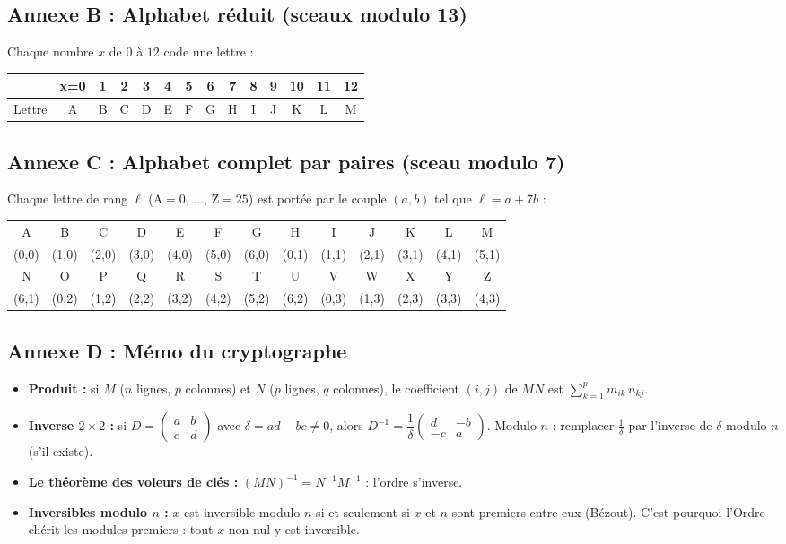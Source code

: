 \documentclass[11pt,a4paper]{article}
\begin{document}
\subsection*{Annexe B : Alphabet réduit (sceaux modulo 13)}
Chaque nombre $x$ de $0$ à $12$ code une lettre :
\begin{center}
	\begin{tabular}{l|*{13}{c}}
		& x=0 & 1 & 2 & 3 & 4 & 5 & 6 & 7 & 8 & 9 & 10 & 11 & 12\\
		\hline
		Lettre & A & B & C & D & E & F & G & H & I & J & K & L & M\\
	\end{tabular}
\end{center}

\subsection*{Annexe C : Alphabet complet par paires (sceau modulo 7)}
Chaque lettre de rang $\ell$ ($\text{A}=0$, $\dots$, $\text{Z}=25$) est portée
par le couple $(a,b)$ tel que $\ell = a + 7b$ :
\begin{center}
	\begin{tabular}{*{13}{c}}
		\toprule
		A & B & C & D & E & F & G & H & I & J & K & L & M\\
		(0,0) & (1,0) & (2,0) & (3,0) & (4,0) & (5,0) & (6,0) & (0,1) & (1,1) & (2,1) & (3,1) & (4,1) & (5,1)\\
		\midrule
		N & O & P & Q & R & S & T & U & V & W & X & Y & Z\\
		(6,1) & (0,2) & (1,2) & (2,2) & (3,2) & (4,2) & (5,2) & (6,2) & (0,3) & (1,3) & (2,3) & (3,3) & (4,3)\\
		\bottomrule
	\end{tabular}
\end{center}

\subsection*{Annexe D : Mémo du cryptographe}
\begin{itemize}
	\item \textbf{Produit :} si $M$ ($n$ lignes, $p$ colonnes) et $N$
	($p$ lignes, $q$ colonnes), le coefficient $(i,j)$ de $MN$ est
	$\sum_{k=1}^{p} m_{ik}\, n_{kj}$.
	\item \textbf{Inverse $2\times 2$ :} si $D = \begin{pmatrix}a&b\\c&d\end{pmatrix}$
	avec $\delta = ad-bc \neq 0$, alors
	$D^{-1} = \dfrac{1}{\delta}\begin{pmatrix}d&-b\\-c&a\end{pmatrix}$.
	Modulo $n$ : remplacer $\frac{1}{\delta}$ par l'inverse de $\delta$
	modulo $n$ (s'il existe).
	\item \textbf{Le théorème des voleurs de clés :}
	$(MN)^{-1} = N^{-1}M^{-1}$ : l'ordre s'inverse.
	\item \textbf{Inversibles modulo $n$ :} $x$ est inversible modulo $n$
	si et seulement si $x$ et $n$ sont premiers entre eux
	(Bézout). C'est pourquoi l'Ordre chérit les modules
	premiers : tout $x$ non nul y est inversible.
\end{itemize}
\end{document}
